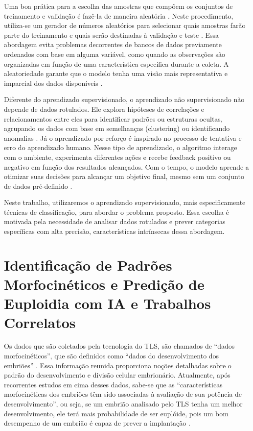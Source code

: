 Uma boa prática para a escolha das amostras que compõem os conjuntos de treinamento e validação é fazê-la de maneira aleatória \cite{izbicki2020}. Neste procedimento, utiliza-se um gerador de números aleatórios para selecionar quais amostras farão parte do treinamento e quais serão destinadas à validação e teste \cite{izbicki2020}. Essa abordagem evita problemas decorrentes de bancos de dados previamente ordenados com base em alguma variável, como quando as observações são organizadas em função de uma característica específica durante a coleta. A aleatoriedade garante que o modelo tenha uma visão mais representativa e imparcial dos dados disponíveis \cite{izbicki2020}.

Diferente do aprendizado supervisionado, o aprendizado não supervisionado não depende de dados rotulados. Ele explora hipóteses de correlações e relacionamentos entre eles para identificar padrões ou estruturas ocultas, agrupando os dados com base em semelhanças (clustering) ou identificando anomalias \cite{russell2016; trask2019}. Já o aprendizado por reforço é inspirado no processo de tentativa e erro do aprendizado humano. Nesse tipo de aprendizado,  o algoritmo interage com o ambiente, experimenta diferentes ações e recebe feedback positivo ou negativo em função dos resultados alcançados. Com o tempo, o modelo aprende a otimizar suas decisões para alcançar um objetivo final, mesmo sem um conjunto de dados pré-definido \cite{risala2023}.

Neste trabalho, utilizaremos o aprendizado supervisionado, mais especificamente técnicas de classificação, para abordar o problema proposto. Essa escolha é motivada pela necessidade de analisar dados rotulados e prever categorias específicas com alta precisão, características intrínsecas dessa abordagem.

\section{Identificação de Padrões Morfocinéticos e Predição de Euploidia com IA e Trabalhos Correlatos}

Os dados que são coletados pela tecnologia do TLS, são chamados de “dados morfocinéticos”, que são definidos como “dados do desenvolvimento dos embriões” \cite{oliveira2024}. Essa informação reunida proporciona noções detalhadas sobre o padrão do desenvolvimento e divisão celular embrionário. Atualmente, após recorrentes estudos em cima desses dados, sabe-se que as “características morfocinéticas dos embriões têm sido associadas à avaliação de sua potência de desenvolvimento”, ou seja, se um embrião analisado pelo TLS tenha um melhor desenvolvimento, ele terá mais probabilidade de ser euplóide, pois um bom desempenho de um embrião é capaz de prever a implantação \cite{yuan2023}.

